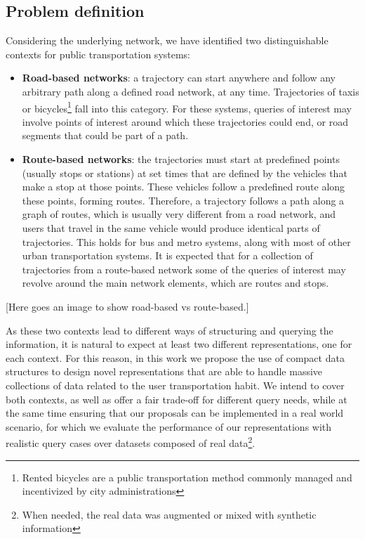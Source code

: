 \documentclass{UniVieCS_PhD} %
\begin{document}
	\subsection{Problem definition}
	\label{sec:pd}
	Considering the underlying network, we have identified two distinguishable contexts for public transportation systems:
	\begin{itemize}
	    \item \textbf{Road-based networks}: a trajectory can start anywhere and follow any arbitrary path along a defined road network, at any time. Trajectories of taxis or bicycles\footnote{Rented bicycles are a public transportation method commonly managed and incentivized by city administrations} fall into this category. For these systems, queries of interest may involve points of interest around which these trajectories could end, or road segments that could be part of a path.
	    \item \textbf{Route-based networks}: the trajectories must start at predefined points (usually stops or stations) at set times that are defined by the vehicles that make a stop at those points. These vehicles follow a predefined route along these points, forming routes. Therefore, a trajectory follows a path along a graph of routes, which is usually very different from a road network, and users that travel in the same vehicle would produce identical parts of trajectories. This holds for bus and metro systems, along with most of other urban transportation systems. It is expected that for a collection of trajectories from a route-based network some of the queries of interest may revolve around the main network elements, which are routes and stops.
	\end{itemize}
	
	[Here goes an image to show road-based vs route-based.]
	
	As these two contexts lead to different ways of structuring and querying the information, it is natural to expect at least two different representations, one for each context. For this reason, in this work we propose the use of compact data structures to design novel representations that are able to handle massive collections of data related to the user transportation habit. We intend to cover both contexts, as well as offer a fair trade-off for different query needs, while at the same time ensuring that our proposals can be implemented in a real world scenario, for which we evaluate the performance of our representations with realistic query cases over datasets composed of real data\footnote{When needed, the real data was augmented or mixed with synthetic information}.
	
\end{document}
